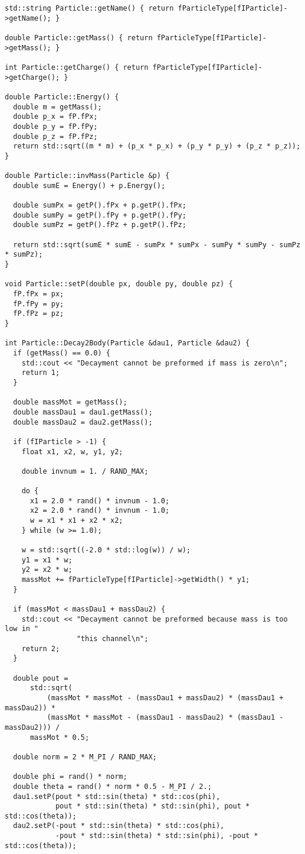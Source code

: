 \begin{lstlisting}
std::string Particle::getName() { return fParticleType[fIParticle]->getName(); }

double Particle::getMass() { return fParticleType[fIParticle]->getMass(); }

int Particle::getCharge() { return fParticleType[fIParticle]->getCharge(); }

double Particle::Energy() {
  double m = getMass();
  double p_x = fP.fPx;
  double p_y = fP.fPy;
  double p_z = fP.fPz;
  return std::sqrt((m * m) + (p_x * p_x) + (p_y * p_y) + (p_z * p_z));
}

double Particle::invMass(Particle &p) {
  double sumE = Energy() + p.Energy();

  double sumPx = getP().fPx + p.getP().fPx;
  double sumPy = getP().fPy + p.getP().fPy;
  double sumPz = getP().fPz + p.getP().fPz;

  return std::sqrt(sumE * sumE - sumPx * sumPx - sumPy * sumPy - sumPz * sumPz);
}

void Particle::setP(double px, double py, double pz) {
  fP.fPx = px;
  fP.fPy = py;
  fP.fPz = pz;
}

int Particle::Decay2Body(Particle &dau1, Particle &dau2) {
  if (getMass() == 0.0) {
    std::cout << "Decayment cannot be preformed if mass is zero\n";
    return 1;
  }

  double massMot = getMass();
  double massDau1 = dau1.getMass();
  double massDau2 = dau2.getMass();

  if (fIParticle > -1) {
    float x1, x2, w, y1, y2;

    double invnum = 1. / RAND_MAX;

    do {
      x1 = 2.0 * rand() * invnum - 1.0;
      x2 = 2.0 * rand() * invnum - 1.0;
      w = x1 * x1 + x2 * x2;
    } while (w >= 1.0);

    w = std::sqrt((-2.0 * std::log(w)) / w);
    y1 = x1 * w;
    y2 = x2 * w;
    massMot += fParticleType[fIParticle]->getWidth() * y1;
  }

  if (massMot < massDau1 + massDau2) {
    std::cout << "Decayment cannot be preformed because mass is too low in "
                 "this channel\n";
    return 2;
  }

  double pout =
      std::sqrt(
          (massMot * massMot - (massDau1 + massDau2) * (massDau1 + massDau2)) *
          (massMot * massMot - (massDau1 - massDau2) * (massDau1 - massDau2))) /
      massMot * 0.5;

  double norm = 2 * M_PI / RAND_MAX;

  double phi = rand() * norm;
  double theta = rand() * norm * 0.5 - M_PI / 2.;
  dau1.setP(pout * std::sin(theta) * std::cos(phi),
            pout * std::sin(theta) * std::sin(phi), pout * std::cos(theta));
  dau2.setP(-pout * std::sin(theta) * std::cos(phi),
            -pout * std::sin(theta) * std::sin(phi), -pout * std::cos(theta));


\end{lstlisting}
